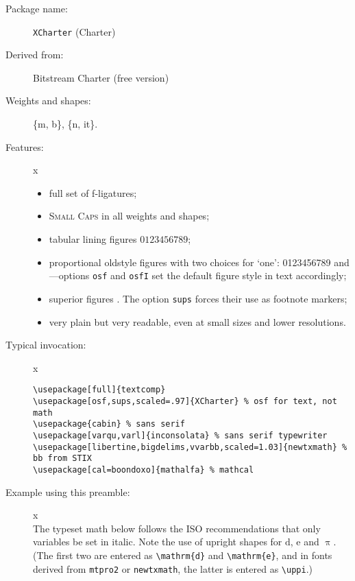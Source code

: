 \documentclass{article}
\def\Pr{\ensuremath{\mathbb{P}}}
\def\d{\mathrm{d}}
\begin{document}
\thispagestyle{empty}
\begin{description}
\item[Package name:] {\tt XCharter} (Charter)
\item[Derived from:] Bitstream Charter (free version)
\item[Weights and shapes:]  \{m, b\}, \{n, it\}. 
\item[Features:]{\color{white}x}\\[-15pt]  
\begin{itemize}
\item
full set of f-ligatures;
\item \textsc{Small Caps} in all weights and shapes;
\item tabular lining figures $0123456789$;
\item proportional oldstyle figures with two choices for `one': 0123456789 and ---options {\tt osf} and {\tt osfI} set the default figure style in text accordingly;
\item superior figures {}. The option {\tt sups} forces their use as footnote markers;
\item very plain but very readable, even at small sizes and lower resolutions.
\end{itemize}
\item[Typical invocation:]{\color{white}x}
\begin{verbatim}
\usepackage[full]{textcomp}
\usepackage[osf,sups,scaled=.97]{XCharter} % osf for text, not math
\usepackage{cabin} % sans serif
\usepackage[varqu,varl]{inconsolata} % sans serif typewriter
\usepackage[libertine,bigdelims,vvarbb,scaled=1.03]{newtxmath} % bb from STIX
\usepackage[cal=boondoxo]{mathalfa} % mathcal
\end{verbatim}
\item[Example using this preamble:]{\color{white}x}\\[6pt]
\lipsum[1]
\def\Pr{\ensuremath{\mathbb{P}}}
\def\d{\mathrm{d}}
The typeset math below follows the ISO recommendations that only variables
be set in italic. Note the use of upright shapes for $\d$, $\mathrm{e}$
and $\uppi$. (The first two are entered as \verb|\mathrm{d}| and
\verb|\mathrm{e}|, and in fonts derived from {\tt mtpro2} or {\tt newtxmath},
 the latter is entered as \verb|\uppi|.)


\end{description}
\end{document}
